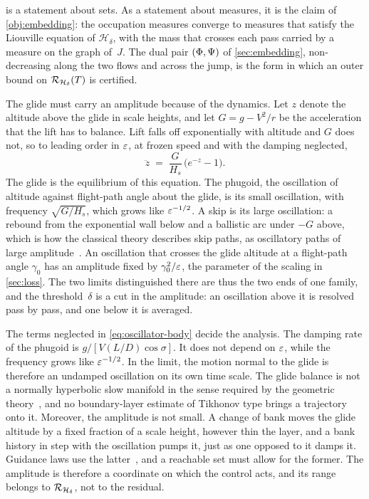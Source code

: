\documentclass[english,11pt]{extarticle}
\begin{document}
 is a statement about sets. As a statement about measures,
it is the claim of \cref{obj:embedding}: the occupation measures converge to
measures that satisfy the Liouville equation of $\mathcal{H}_\delta$, with
the mass that crosses each pass carried by a measure on the graph of~$J$.
The dual pair $(\Phi,\Psi)$ of \cref{sec:embedding}, non-decreasing along
the two flows and across the jump, is the form in which an outer bound on
$\mathcal{R}_{\mathcal{H}_\delta}(T)$ is certified.

The glide must carry an amplitude because of the dynamics. Let $z$ denote
the altitude above the glide in scale heights, and let $G = g - V^2/r$ be
the acceleration that the lift has to balance. Lift falls off exponentially
with altitude and $G$ does not, so to leading order in $\varepsilon$, at frozen
speed and with the damping neglected,
\begin{equation}\label{eq:oscillator-body}
  \ddot z \;=\; \frac{G}{H_s}\,\bigl(e^{-z} - 1\bigr) .
\end{equation}
The glide is the equilibrium of this equation. The phugoid, the oscillation
of altitude against flight-path angle about the glide, is its small
oscillation, with frequency $\sqrt{G/H_s}$, which grows like
$\varepsilon^{-1/2}$. A skip is its large oscillation: a rebound from the
exponential wall below and a ballistic arc under $-G$ above, which is how
the classical theory describes skip paths, as oscillatory paths of large
amplitude~\cite{shi1971skip}. An oscillation that crosses the glide altitude
at a flight-path angle $\gamma_0$ has an amplitude fixed by
$\gamma_0^2/\varepsilon$, the parameter of the scaling in \cref{sec:loss}. The two
limits distinguished there are thus the two ends of one family, and the
threshold~$\delta$ is a cut in the amplitude: an oscillation above it is
resolved pass by pass, and one below it is averaged.

The terms neglected in \cref{eq:oscillator-body} decide the analysis. The
damping rate of the phugoid is $g/[V(L/D)\cos\sigma]$. It does not depend on
$\varepsilon$, while the frequency grows like $\varepsilon^{-1/2}$. In the limit, the
motion normal to the glide is therefore an undamped oscillation on its own
time scale. The glide balance is not a normally hyperbolic slow manifold in
the sense required by the geometric theory~\cite{fenichel1979geometric}, and
no boundary-layer estimate of Tikhonov type brings a trajectory onto it.
Moreover, the amplitude is not small. A change of bank moves the glide
altitude by a fixed fraction of a scale height, however thin the layer, and
a bank history in step with the oscillation pumps it, just as one opposed to
it damps it. Guidance laws use the latter~\cite{lu2014entry}, and a
reachable set must allow for the former. The amplitude is therefore a
coordinate on which the control acts, and its range belongs to
$\mathcal{R}_{\mathcal{H}_\delta}$, not to the residual.
\end{document}
